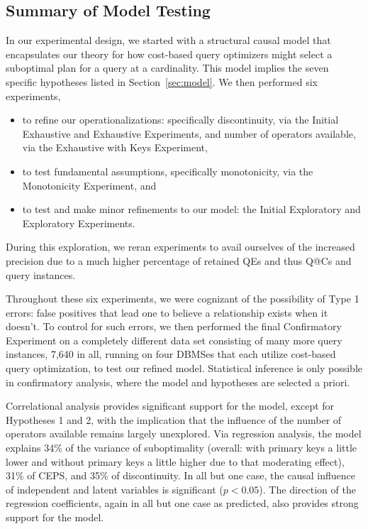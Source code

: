 \documentclass[prodmode,acmtods]{acmsmall}
\begin{document}
\subsection{Summary of Model Testing}
In our experimental design, we started with a structural causal model that
encapsulates our theory for how cost-based query optimizers might select a
suboptimal plan for a query at a cardinality. This model implies the seven
specific hypotheses listed in Section~\ref{sec:model}. We then performed
six experiments,
\begin{itemize}
\item to refine our operationalizations: specifically discontinuity,
via the Initial \hbox{Exhaustive} and Exhaustive \hbox{Experiments}, and number of operators available, via the
Exhaustive with Keys \hbox{Experiment},
\item to test fundamental assumptions, specifically
monotonicity, via the Monotonicity \hbox{Experiment}, and
\item to test and make minor
refinements to our model: the Initial Exploratory and \hbox{Exploratory}
Experiments.
\end{itemize}
During this exploration,  we reran
\hbox{experiments} to avail ourselves of the increased precision due to a much
higher percentage of retained QEs and thus Q@Cs and query instances.

Throughout these six experiments, we were cognizant of the
possibility of Type 1 errors: false positives that lead one to believe a
relationship exists when it doesn't.
To control for such errors, we then performed the final Confirmatory 
Experiment on a completely different data set consisting of many more 
query instances, 7,640 in all, running on four \hbox{DBMSes} that each
utilize cost-based query optimization, to test
our refined model. Statistical inference is only possible in confirmatory
analysis, where the model and hypotheses are selected a priori.

Correlational analysis provides significant support for the model, except
for Hypotheses 1 and 2, with the implication that the influence of the
number of operators available remains largely unexplored. Via regression
analysis, the model explains 34\% of the variance of suboptimality (overall:
with primary keys a little lower and without primary keys a little higher
due to that moderating effect), 31\% of CEPS, and 35\% of discontinuity. In
all but one case, the causal influence of independent and latent variables is significant
($p<0.05$). The direction of the regression coefficients, again in all but one
case as predicted, also provides strong support for the model.
\end{document}
